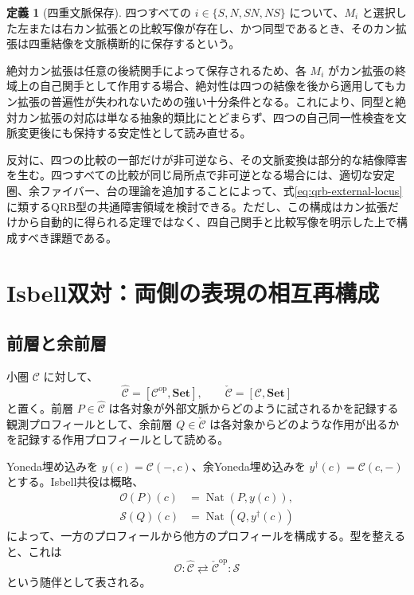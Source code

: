\documentclass[a4paper,11pt]{ltjsarticle}
\theoremstyle{definition}
\newtheorem{definition}{定義}[section]
\theoremstyle{plain}
\newcommand{\Set}{\mathbf{Set}}
\newcommand{\Nat}{\operatorname{Nat}}
\newcommand{\op}{\mathrm{op}}
\newcommand{\PSh}{\widehat{\mathcal C}}
\newcommand{\CoPSh}{\check{\mathcal C}}
\begin{document}
\begin{definition}[四重文脈保存]
四つすべての $i\in\{S,N,SN,NS\}$ について、$M_i$ と選択した左または右カン拡張との比較写像が存在し、かつ同型であるとき、そのカン拡張は四重結像を文脈横断的に保存するという。
\end{definition}

絶対カン拡張は任意の後続関手によって保存されるため、各 $M_i$ がカン拡張の終域上の自己関手として作用する場合、絶対性は四つの結像を後から適用してもカン拡張の普遍性が失われないための強い十分条件となる。これにより、同型と絶対カン拡張の対応は単なる抽象的類比にとどまらず、四つの自己同一性検査を文脈変更後にも保持する安定性として読み直せる。

反対に、四つの比較の一部だけが非可逆なら、その文脈変換は部分的な結像障害を生む。四つすべての比較が同じ局所点で非可逆となる場合には、適切な安定圏、余ファイバー、台の理論を追加することによって、式\eqref{eq:qrb-external-locus}に類するQRB型の共通障害領域を検討できる。ただし、この構成はカン拡張だけから自動的に得られる定理ではなく、四自己関手と比較写像を明示した上で構成すべき課題である。

\section{Isbell双対：両側の表現の相互再構成}

\subsection{前層と余前層}

小圏 $\mathcal C$ に対して、
\begin{equation}
 \PSh=[\mathcal C^{\op},\Set],
 \qquad
 \CoPSh=[\mathcal C,\Set]
\end{equation}
と置く。前層 $P\in\PSh$ は各対象が外部文脈からどのように試されるかを記録する観測プロフィールとして、余前層 $Q\in\CoPSh$ は各対象からどのような作用が出るかを記録する作用プロフィールとして読める。

Yoneda埋め込みを $y(c)=\mathcal C(-,c)$、余Yoneda埋め込みを $y^{\dagger}(c)=\mathcal C(c,-)$ とする。Isbell共役は概略、
\begin{align}
 \mathcal O(P)(c)&=\Nat(P,y(c)),\\
 \mathcal S(Q)(c)&=\Nat(Q,y^{\dagger}(c))
\end{align}
によって、一方のプロフィールから他方のプロフィールを構成する\cite{Isbell1960}。型を整えると、これは
\begin{equation}
 \mathcal O:\PSh
 \rightleftarrows
 \CoPSh^{\op}:\mathcal S
\end{equation}
という随伴として表される。
\end{document}
